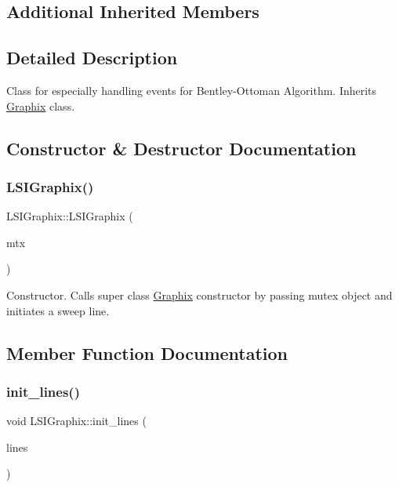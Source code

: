 \subsection*{Additional Inherited Members}


\subsection{Detailed Description}
Class for especially handling events for Bentley-\/\+Ottoman Algorithm. Inherits \hyperlink{classGraphix}{Graphix} class. 

\subsection{Constructor \& Destructor Documentation}
\mbox{\label{classLSIGraphix_a36adc59a5f2f87571cb230de95e0c0bc}} 
\subsubsection{\texorpdfstring{L\+S\+I\+Graphix()}{LSIGraphix()}}
{\footnotesize\ttfamily L\+S\+I\+Graphix\+::\+L\+S\+I\+Graphix (\begin{DoxyParamCaption}\item[{std\+::mutex \&}]{mtx }\end{DoxyParamCaption})}

Constructor. Calls super class \hyperlink{classGraphix}{Graphix} constructor by passing mutex object and initiates a sweep line. 

\subsection{Member Function Documentation}
\mbox{\label{classLSIGraphix_aa95fa264bddca976f974f6eae9173444}} 
\subsubsection{\texorpdfstring{init\+\_\+lines()}{init\_lines()}}
{\footnotesize\ttfamily void L\+S\+I\+Graphix\+::init\+\_\+lines (\begin{DoxyParamCaption}\item[{std\+::vector$<$ \hyperlink{classLineSegment}{Line\+Segment} $>$}]{lines }\end{DoxyParamCaption})}

